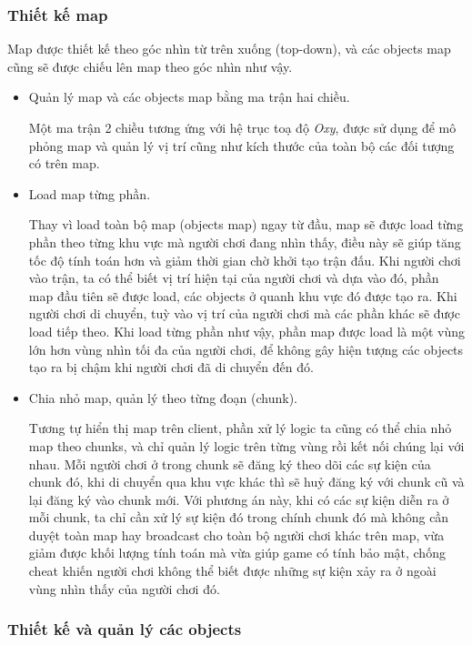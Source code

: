 \documentclass[12pt,a4paper]{article}
\begin{document}
  \subsubsection{Thiết kế map}
  Map được thiết kế theo góc nhìn từ trên xuống (top-down), và các objects map cũng sẽ được chiếu lên map theo góc nhìn như vậy.
  \begin{itemize}
      \item Quản lý map và các objects map bằng ma trận hai chiều.

      Một ma trận 2 chiều tương ứng với hệ trục toạ độ \textit{Oxy}, được sử dụng để mô phỏng map và quản lý vị trí cũng như kích thước của toàn bộ các đối tượng có trên map.
      
      \item Load map từng phần.
      
      Thay vì load toàn bộ map (objects map) ngay từ đầu, map sẽ được load từng phần theo từng khu vực mà người chơi đang nhìn thấy, điều này sẽ giúp tăng tốc độ tính toán hơn và giảm thời gian chờ khởi tạo trận đấu. Khi người chơi vào trận, ta có thể biết vị trí hiện tại của người chơi và dựa vào đó, phần map đầu tiên sẽ được load, các objects ở quanh khu vực đó được tạo ra. Khi người chơi di chuyển, tuỳ vào vị trí của người chơi mà các phần khác sẽ được load tiếp theo. Khi load từng phần như vậy, phần map được load là một vùng lớn hơn vùng nhìn tối đa của người chơi, để không gây hiện tượng các objects tạo ra bị chậm khi người chơi đã di chuyển đến đó.
      
      \item Chia nhỏ map, quản lý theo từng đoạn (chunk).
      
      Tương tự hiển thị map trên client, phần xử lý logic ta cũng có thể chia nhỏ map theo chunks, và chỉ quản lý logic trên từng vùng rồi kết nối chúng lại với nhau. Mỗi người chơi ở trong chunk sẽ đăng ký theo dõi các sự kiện của chunk đó, khi di chuyển qua khu vực khác thì sẽ huỷ đăng ký với chunk cũ và lại đăng ký vào chunk mới. Với phương án này, khi có các sự kiện diễn ra ở mỗi chunk, ta chỉ cần xử lý sự kiện đó trong chính chunk đó mà không cần duyệt toàn map hay broadcast cho toàn bộ người chơi khác trên map, vừa giảm được khối lượng tính toán mà vừa giúp game có tính bảo mật, chống cheat khiến người chơi không thể biết được những sự kiện xảy ra ở ngoài vùng nhìn thấy của người chơi đó.
  \end{itemize}
  
  \subsubsection{Thiết kế và quản lý các objects}
\end{document}
